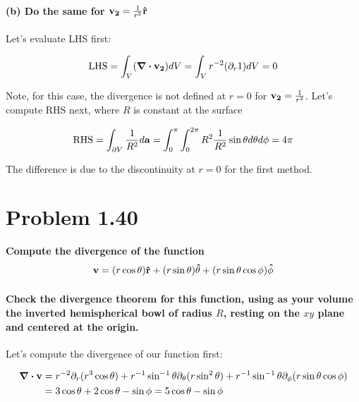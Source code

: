 \documentclass{article}
\numberwithin{equation}{section}
\newcommand{\vbh}[1]{\vb{\hat{#1}}}
\begin{document}
\paragraph{(b) Do the same for $\vb{v_2} = \frac{1}{r^2} \vbh{r}$\\}

Let's evaluate LHS first:

\begin{equation}
    \text{LHS} = \int_V (\div \vb{v_2}) dV = \int_V r^{-2} (\partial_r 1) dV = 0
\end{equation}

Note, for this case, the divergence is not defined at $r = 0$ for $\vb{v_2} = \frac{1}{r^2}$. Let's compute RHS next, where $R$ is constant at the surface

\begin{equation}
    \text{RHS} = \int_{\partial V} \frac{1}{R^2} d \vb{a} =\int_{0}^\pi \int_0^{2\pi} R^2 \frac{1}{R^2} \sin \theta d \theta d \phi = 4 \pi
\end{equation}

The difference is due to the discontinuity at $r = 0$ for the first method. 

\section{Problem 1.40}

\textbf{Compute the divergence of the function}
\begin{equation*}
    \vb{v} = (r \cos \theta) \vbh{r} + (r \sin \theta) \vbh{\theta} + (r \sin \theta \cos \phi) \vbh{\phi}
\end{equation*}
\paragraph{Check the divergence theorem for this function, using as your volume the inverted hemispherical bowl of radius $R$, resting on the $xy$ plane and centered at the origin. \\}

Let's compute the divergence of our function first:

\begin{equation}
\begin{split}
    \div \vb{v} &= r^{-2} \partial_r (r^3 \cos \theta) + r^{-1} \sin^{-1} \theta \partial_\theta (r \sin^2 \theta ) + r^{-1} \sin^{-1}\theta \partial_\phi ( r \sin \theta \cos \phi) \\
    &= 3 \cos \theta + 2 \cos \theta - \sin \phi = 5 \cos \theta - \sin \phi
\end{split}
\end{equation}
\end{document}
